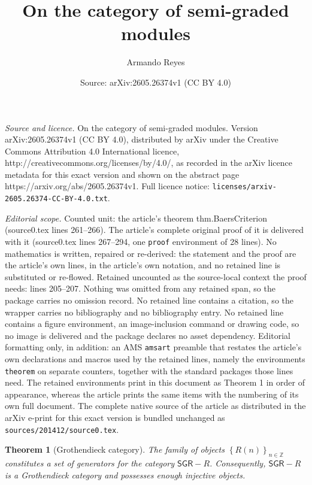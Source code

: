 \documentclass[10pt,a4paper]{amsart}
\title{On the category of semi-graded modules}
\author{Armando Reyes}
\date{Source: arXiv:2605.26374v1 (CC BY 4.0)}
\newtheorem{theorem}{Theorem}
\begin{document}
\maketitle

\noindent\emph{Source and licence.} On the category of semi-graded modules. Version arXiv:2605.26374v1 (CC BY 4.0), distributed by arXiv under the Creative Commons Attribution 4.0 International licence, http://creativecommons.org/licenses/by/4.0/, as recorded in the arXiv licence metadata for this exact version and shown on the abstract page https://arxiv.org/abs/2605.26374v1. Full licence notice: \texttt{licenses/arxiv-2605.26374-CC-BY-4.0.txt}.\par\smallskip

\noindent\textit{Editorial scope.} Counted unit: the article's theorem thm.BaersCriterion (source0.tex lines 261--266). The article's complete original proof of it is delivered with it (source0.tex lines 267--294, one \texttt{proof} environment of 28 lines). No mathematics is written, repaired or re-derived: the statement and the proof are the article's own lines, in the article's own notation, and no retained line is substituted or re-flowed.  Retained uncounted as the source-local context the proof needs: lines 205--207.  Nothing was omitted from any retained span, so the package carries no omission record.  No retained line contains a citation, so the wrapper carries no bibliography and no bibliography entry.  No retained line contains a figure environment, an image-inclusion command or drawing code, so no image is delivered and the package declares no asset dependency.  Editorial formatting only, in addition: an AMS \texttt{amsart} preamble that restates the article's own declarations and macros used by the retained lines, namely the environments \texttt{theorem} on separate counters, together with the standard packages those lines need.  The retained environments print in this document as Theorem 1 in order of appearance, whereas the article prints the same items with the numbering of its own full document.  The complete native source of the article as distributed in the arXiv e-print for this exact version is bundled unchanged as \texttt{sources/201412/source0.tex}.
\begin{theorem}[Grothendieck category]\label{Grothendieckcategory}
The family of objects $\left\{R(n)\right\}_{n \in \mathbb{Z}}$ constitutes a set of generators for the category $\mathsf{SGR}-R$. Consequently, $\mathsf{SGR}-R$ is a Grothendieck category and possesses enough injective objects.
\end{theorem}
\end{document}
